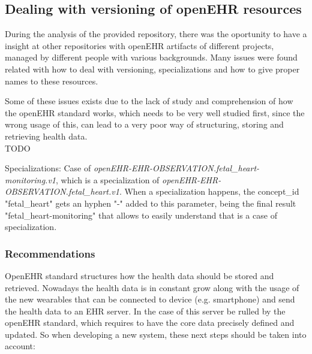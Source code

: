 \documentclass[mim_thesis.tex]{subfiles}
\begin{document}
\subsection{Dealing with versioning of openEHR resources}

During the analysis of the provided repository, there was the oportunity to have a insight at other repositories with openEHR artifacts of different projects, managed by different people with various backgrounds. Many issues were found related with how to deal with versioning, specializations and how to give proper names to these resources.  

Some of these issues exists due to the lack of study and comprehension of how the openEHR standard works, which needs to be very well studied first, since the wrong usage of this, can lead to a very poor way of structuring, storing and retrieving health data. \\

TODO

Specializations: Case of \textit{openEHR-EHR-OBSERVATION.fetal\_heart-monitoring.v1}, which is a specialization of \textit{openEHR-EHR-OBSERVATION.fetal\_heart.v1}. When a specialization happens, the concept\_id "fetal\_heart" gets an hyphen "-" added to this parameter, being the final result "fetal\_heart-monitoring" that allows to easily understand that is a case of specialization.

\subsubsection{Recommendations}
OpenEHR standard structures how the health data should be stored and retrieved. Nowadays the health data is in constant grow along with the usage of the new wearables that can be connected to device (e.g. smartphone) and send the health data to an EHR server. In the case of this server be rulled by the openEHR standard, which requires to have the core data precisely defined and updated. So when developing a new system, these next steps should be taken into account:
\end{document}
